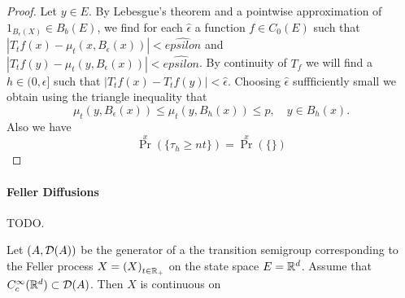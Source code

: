 \documentclass[../Master.tex]{subfiles}
\begin{document}
\begin{proof}
  Let \(y \in E\). By Lebesgue's theorem and a pointwise approximation of \(1_{B_\epsilon(X)} \in B_b(E)\), we find for each \(\hat{\epsilon}\) a function \(f \in C_0(E)\) such that \(\left\lvert T_t f(x) - \mu_t(x, B_\epsilon(x)) \right\rvert < \hat{epsilon}\) and \(\left\lvert T_t f(y) - \mu_t(y, B_\epsilon(x)) \right\rvert < \hat{epsilon}\). By continuity of \(T_f\) we will find a \(h \in (0, \epsilon]\) such that \(\left\lvert T_t f(x) - T_t f(y) \right\rvert < \hat{\epsilon}\). Choosing \(\hat{\epsilon}\) suffficiently small we obtain using the triangle inequality that
  \begin{equation*}
    \mu_t(y, B_\epsilon(x)) \le \mu_t(y, B_h(x)) \le p, \quad y \in B_h(x).
  \end{equation*}
  Also we have
  \begin{equation*}
    \Pr^x(\{\tau_h \ge nt\}) = \Pr^x(\{\})
  \end{equation*}

\end{proof}
\paragraph{Feller Diffusions}
TODO.



\begin{theorem}
  Let \({(A, \mathcal{D}(A))}\) be the generator of a the transition semigroup corresponding to the Feller process \(X = {(X)}_{t \in \mathbb{R}_+}\) on the state space \(E = \mathbb{R}^d\). Assume that \(C_c^\infty(\mathbb{R}^d) \subset \mathcal{D}(A)\). Then \(X\) is continuous on 
\end{theorem}
\end{document}
